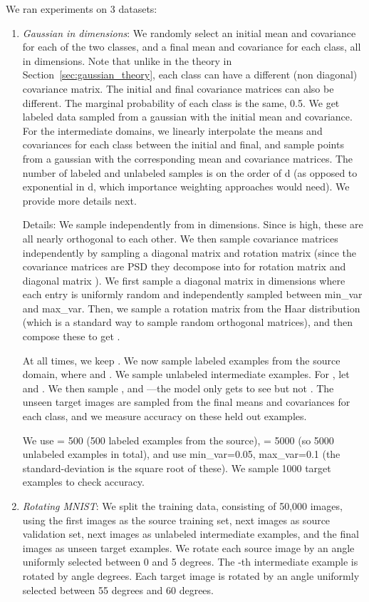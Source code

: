 \documentclass[11pt]{article}
\begin{document}
We ran experiments on 3 datasets:
\begin{enumerate}
\item \emph{Gaussian in  dimensions}: We randomly select an initial mean and covariance for each of the two classes, and a final mean and covariance for each class, all in  dimensions. Note that unlike in the theory in Section~\ref{sec:gaussian_theory}, each class can have a different (non diagonal) covariance matrix. The initial and final covariance matrices can also be different. The marginal probability of each class is the same, 0.5. We get labeled data sampled from a gaussian with the initial mean and covariance. For the intermediate domains, we linearly interpolate the means and covariances for each class between the initial and final, and sample points from a gaussian with the corresponding mean and covariance matrices. The number of labeled and unlabeled samples is on the order of d (as opposed to exponential in d, which importance weighting approaches would need). We provide more details next.

Details: We sample  independently from  in  dimensions. Since  is high, these are all nearly orthogonal to each other. We then sample covariance matrices  independently by sampling a diagonal matrix and rotation matrix (since the covariance matrices are PSD they decompose into  for rotation matrix  and diagonal matrix ). We first sample a diagonal matrix  in  dimensions where each entry is uniformly random and independently sampled between min\_var and max\_var. Then, we sample a rotation matrix  from the Haar distribution (which is a standard way to sample random orthogonal matrices), and then compose these to get .

At all times, we keep . We now sample  labeled examples from the source domain, where  and .
We sample  unlabeled intermediate examples. For , let  and . We then sample , and ---the model only gets to see  but not . The unseen target images are sampled from the final means and covariances for each class, and we measure accuracy on these held out examples.

We use  = 500 (500 labeled examples from the source),  = 5000 (so 5000 unlabeled examples in total), and use min\_var=0.05, max\_var=0.1 (the standard-deviation is the square root of these).  We sample 1000 target examples to check accuracy.

\item \emph{Rotating MNIST}: We split the training data, consisting of 50,000 images, using the first  images as the source training set, next  images as source validation set, next  images as unlabeled intermediate examples, and the final  images as unseen target examples. We rotate each source image by an angle uniformly selected between 0 and 5 degrees. The -th intermediate example is rotated by angle  degrees. Each target image is rotated by an angle uniformly selected between 55 degrees and 60 degrees.


\end{enumerate}
\end{document}
